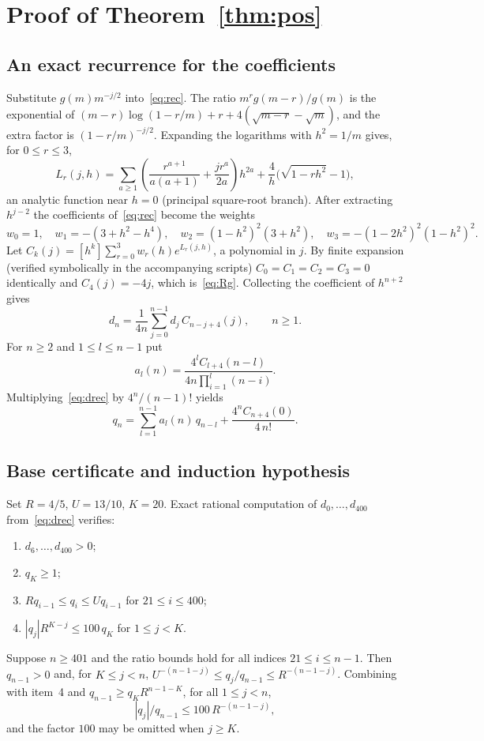 \documentclass[11pt,a4paper]{article}
\theoremstyle{remark}
\begin{document}
\section{Proof of Theorem~\ref{thm:pos}}\label{sec:pos}

\subsection{An exact recurrence for the coefficients}

Substitute $g(m)m^{-j/2}$ into~\eqref{eq:rec}. The ratio $m^rg(m-r)/g(m)$ is the exponential of $(m-r)\log(1-r/m)+r+4(\sqrt{m-r}-\sqrt m)$, and the extra factor is $(1-r/m)^{-j/2}$. Expanding the logarithms with $h^2=1/m$ gives, for $0\le r\le3$,
\[
  L_r(j,h)=\sum_{a\ge1}\left(\frac{r^{a+1}}{a(a+1)}+\frac{jr^a}{2a}\right)h^{2a}+\frac4h\bigl(\sqrt{1-rh^2}-1\bigr),
\]
an analytic function near $h=0$ (principal square-root branch). After extracting $h^{j-2}$ the coefficients of~\eqref{eq:rec} become the weights
\[
  w_0=1,\quad w_1=-(3+h^2-h^4),\quad w_2=(1-h^2)^2(3+h^2),\quad w_3=-(1-2h^2)^2(1-h^2)^2 .
\]
Let $C_k(j)=[h^k]\sum_{r=0}^3w_r(h)e^{L_r(j,h)}$, a polynomial in $j$. By finite expansion (verified symbolically in the accompanying scripts) $C_0=C_1=C_2=C_3=0$ identically and $C_4(j)=-4j$, which is~\eqref{eq:Rg}. Collecting the coefficient of $h^{n+2}$ gives
\begin{equation}\label{eq:drec}
  d_n=\frac1{4n}\sum_{j=0}^{n-1}d_j\,C_{n-j+4}(j),\qquad n\ge1 .
\end{equation}
For $n\ge2$ and $1\le l\le n-1$ put
\[
  a_l(n)=\frac{4^lC_{l+4}(n-l)}{4n\prod_{i=1}^l(n-i)} .
\]
Multiplying~\eqref{eq:drec} by $4^n/(n-1)!$ yields
\begin{equation}\label{eq:qrec}
  q_n=\sum_{l=1}^{n-1}a_l(n)\,q_{n-l}+\frac{4^nC_{n+4}(0)}{4\,n!} .
\end{equation}

\subsection{Base certificate and induction hypothesis}

Set $R=4/5$, $U=13/10$, $K=20$. Exact rational computation of $d_0,\dots,d_{400}$ from~\eqref{eq:drec} verifies:
\begin{enumerate}
  \item $d_6,\dots,d_{400}>0$;
  \item $q_K\ge1$;
  \item $Rq_{i-1}\le q_i\le Uq_{i-1}$ for $21\le i\le400$;
  \item $|q_j|R^{K-j}\le100\,q_K$ for $1\le j<K$.
\end{enumerate}
Suppose $n\ge401$ and the ratio bounds hold for all indices $21\le i\le n-1$. Then $q_{n-1}>0$ and, for $K\le j<n$, $U^{-(n-1-j)}\le q_j/q_{n-1}\le R^{-(n-1-j)}$. Combining with item~4 and $q_{n-1}\ge q_KR^{n-1-K}$, for all $1\le j<n$,
\begin{equation}\label{eq:qratio}
  |q_j|/q_{n-1}\le100\,R^{-(n-1-j)},
\end{equation}
and the factor $100$ may be omitted when $j\ge K$.
\end{document}
